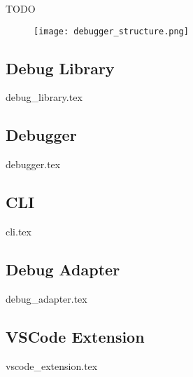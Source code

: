  

TODO

\begin{figure}[h]
    \centering
    \texttt{[image: debugger\_structure.png]}
    \label{fig:EDBStruct}
\end{figure}

\subsection{Debug Library}
{debug_library.tex}

\subsection{Debugger}
{debugger.tex}

\subsection{CLI}
{cli.tex}

\subsection{Debug Adapter}
{debug_adapter.tex}

\subsection{VSCode Extension}
{vscode_extension.tex}

